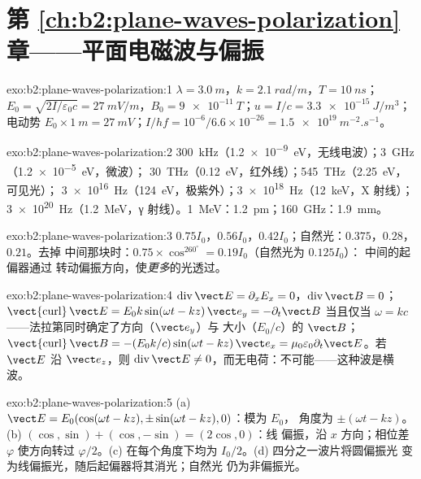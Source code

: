 \section*{第 \ref{ch:b2:plane-waves-polarization} 章——平面电磁波与偏振}

\begin{solution}{exo:b2:plane-waves-polarization:1}
$\lambda = \qty{3.0}{m}$，$k = \qty{2.1}{rad/m}$，$T = \qty{10}{ns}$；$E_0 = \sqrt{2I/\varepsilon_0c}
= \qty{27}{mV/m}$，$B_0 = \qty{9e-11}{T}$；$u = I/c = \qty{3.3e-15}{J/m^3}$；电动势
$E_0 \times \qty{1}{m} = \qty{27}{mV}$；$I/hf = 10^{-6}/6.6 \times 10^{-26} = \qty{1.5e19}{m^{-2}.s^{-1}}$。
\end{solution}

\begin{solution}{exo:b2:plane-waves-polarization:2}
\qty{300}{kHz}（\qty{1.2e-9}{eV}，无线电波）；\qty{3}{GHz}（\qty{1.2e-5}{eV}，微波）；
\qty{30}{THz}（\qty{0.12}{eV}，红外线）；\qty{545}{THz}（\qty{2.25}{eV}，可见光）；
\qty{3e16}{Hz}（\qty{124}{eV}，极紫外）；\qty{3e18}{Hz}（\qty{12}{keV}，X 射线）；
\qty{3e20}{Hz}（\qty{1.2}{MeV}，γ 射线）。\qty{1}{MeV}：\qty{1.2}{pm}；\qty{160}{GHz}：\qty{1.9}{mm}。
\end{solution}

\begin{solution}{exo:b2:plane-waves-polarization:3}
$0.75I_0$，$0.56I_0$，$0.42I_0$；自然光：$0.375$，$0.28$，$0.21$。去掉
中间那块时：$0.75 \times \cos^260^\circ = 0.19I_0$（自然光为 $0.125I_0$）：
中间的起偏器通过
转动偏振方向，使\emph{更多}的光透过。
\end{solution}

\begin{solution}{exo:b2:plane-waves-polarization:4}
$\operatorname{div}\vect E = \partial_xE_x = 0$，$\operatorname{div}\vect B = 0$；
$\operatorname{\vect{curl}}\vect E = E_0k\sin(\omega t - kz)\,\vect e_y = -\partial_t\vect B$ 当且仅当 $\omega =
kc$——法拉第同时确定了方向（$\vect e_y$）与
大小（$E_0/c$）的 $\vect B$；$\operatorname{\vect{curl}}\vect B = -(E_0k/c)\sin(\omega t - kz)\,\vect e_x
= \mu_0\varepsilon_0\partial_t\vect E$。若 $\vect E$ 沿 $\vect e_z$，则 $\operatorname{div}
\vect E \ne 0$，而无电荷：不可能——这种波是横波。
\end{solution}

\begin{solution}{exo:b2:plane-waves-polarization:5}
(a) $\vect E = E_0(\cos(\omega t - kz), \pm\sin(\omega t - kz), 0)$：模为 $E_0$，
角度为 $\pm(\omega t - kz)$。(b) $(\cos, \sin) + (\cos, -\sin) = (2\cos, 0)$：线
偏振，沿 $x$ 方向；相位差 $\varphi$ 使方向转过 $\varphi/2$。(c)
在每个角度下均为 $I_0/2$。(d) 四分之一波片将圆偏振光
变为线偏振光，随后起偏器将其消光；自然光
仍为非偏振光。
\end{solution}

